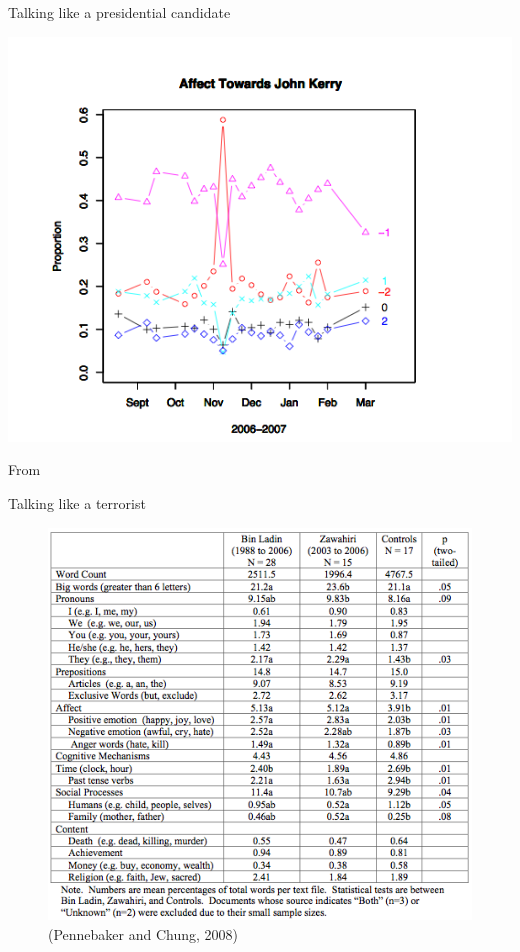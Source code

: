 \documentclass{hertieteaching}
\begin{document}
\begin{frame}{Talking like a presidential candidate}

\centerline{\includegraphics[width=0.55\linewidth]{pictures/kerry-blogs}} 

\centerline{From \textcite{Hopkin.King2010}}

\end{frame}

\begin{frame}{Talking like a terrorist}
\protect\hypertarget{talking-like-a-terrorist}{}

\begin{figure}

{\centering \includegraphics[width=0.9\linewidth]{pictures/binladen} 

}

\caption{(Pennebaker and Chung, 2008)}\label{fig:unnamed-chunk-4}
\end{figure}

\end{frame}
\end{document}

